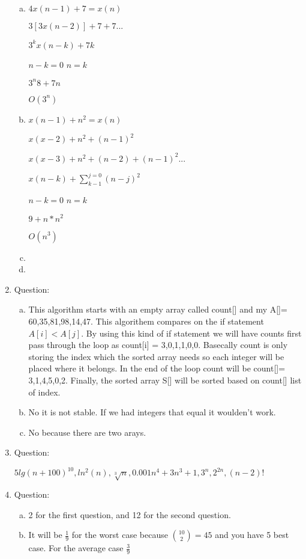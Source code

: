 \documentclass{article}
\begin{document}
\begin{enumerate}
\begin{enumerate}[(a)]
    \item $4x(n-1)+7=x(n)$

          $3[3x(n-2)]+7+7...$

          $3^{k}x(n-k)+7k$

          $n-k=0$ $n=k$

          $3^{n}8+7n$

          $O(3^n)$

    \item $x(n-1)+n^2=x(n)$

          $x(x-2)+n^2+(n-1)^2$

          $x(x-3)+n^2+(n-2)+(n-1)^2...$

          $x(n-k)+\sum_{k-1}^{j=0}(n-j)^2$

          $n-k=0$ $n=k$

          $9+n*n^2$

          $O(n^3)$

    \item

    \item





  \end{enumerate}

  \item Question:
  \begin{enumerate}[(a)]
    \item
    This algorithm starts with an empty array called count[] and my A[]= 60,35,81,98,14,47.
    This algorithem compares on the if statement $A[i] < A[j]$. By using this kind of if statement
    we will have counts first pass through the loop as count[i] = 3,0,1,1,0,0. Basecally count is only storing the index which the sorted array needs so each integer will be placed where it belongs. In the end of the loop count will be count[]= 3,1,4,5,0,2. Finally, the sorted array S[] will be sorted based on count[] list of index.
    \item
    No it is not stable. If we had integers that equal it woulden't work.
    \item No because there are two arays.

  \end{enumerate}
  \item Question:

  $5lg(n+100)^{10}, ln^2(n), \sqrt[3]{n}, 0.001n^4+3n^3+1, 3^n, 2^{2n}, (n-2)!$

  \item Question:
  \begin{enumerate}[(a)]

    \item 2 for the first question, and 12 for the second question.

    \item It will be $\frac{1}{9}$ for the worst case because  $\binom{10}{2}=45$ and you have 5 best case. For the average case $\frac{3}{9}$


  \end{enumerate}

\end{enumerate}
\end{document}
